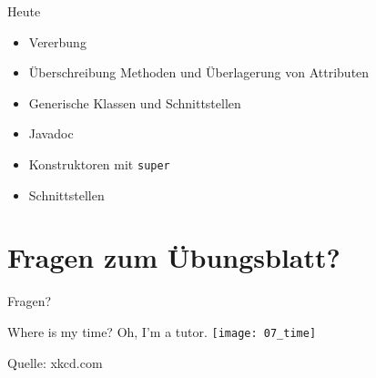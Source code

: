 \documentclass[18pt]{beamer}
\begin{document}
\begin{frame}[fragile]{Heute}
\begin{itemize}
 \item Vererbung \checkmark
 \item Überschreibung Methoden und Überlagerung von Attributen \checkmark
 \item Generische Klassen und Schnittstellen \checkmark
 \item Javadoc \checkmark
 \item Konstruktoren mit \verb|super| \checkmark
 \item Schnittstellen \checkmark
\end{itemize}
\end{frame}


\section{Fragen zum Übungsblatt?}
\begin{frame}{Fragen?}
\end{frame}



\begin{frame}{Where is my time? Oh, I'm a tutor.}
 \texttt{[image: 07\_time]}
 
 \tiny{Quelle: xkcd.com}
\end{frame}
\end{document}
